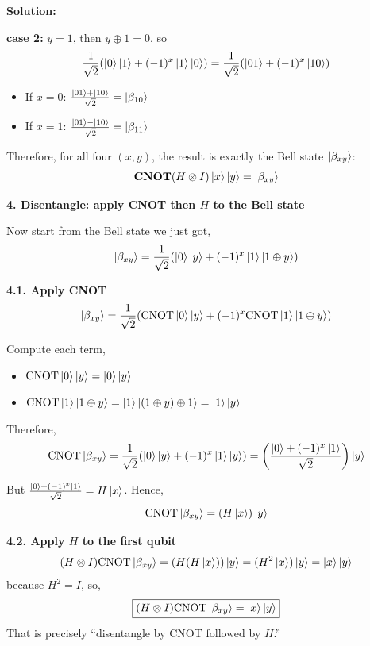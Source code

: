 \documentclass[11pt]{article}
\newenvironment{solution}
{\par\noindent\textbf{Solution:}\par}
{\vspace{1em}}
\begin{document}
\begin{solution}
\textbf{case 2:} $y = 1$, then $y \oplus 1 = 0$, so
\[
\frac{1}{\sqrt{2}}(\ket{0}\ket{1} + (-1)^x\ket{1}\ket{0}) = \frac{1}{\sqrt{2}}(\ket{01} + (-1)^x\ket{10})
\]
\begin{itemize}
    \item If $x = 0$: $\frac{\ket{01} + \ket{10}}{\sqrt{2}} = \ket{\beta_{10}}$
    \item If $x = 1$: $\frac{\ket{01} - \ket{10}}{\sqrt{2}} = \ket{\beta_{11}}$
\end{itemize}

Therefore, for all four $(x, y)$, the result is exactly the Bell state $\ket{\beta_{xy}}$:
\[
\textbf{CNOT}(H \otimes I)\ket{x}\ket{y} = \ket{\beta_{xy}}
\]

\textbf{4. Disentangle: apply CNOT then $H$ to the Bell state}

Now start from the Bell state we just got,
\[
\ket{\beta_{xy}} = \frac{1}{\sqrt{2}}(\ket{0}\ket{y} + (-1)^x \ket{1}\ket{1 \oplus y})
\]

\textbf{4.1. Apply CNOT}
\[
\ket{\beta_{xy}} = \frac{1}{\sqrt{2}}(\text{CNOT}\ket{0}\ket{y} + (-1)^x \text{CNOT}\ket{1}\ket{1 \oplus y})
\]

Compute each term,
\begin{itemize}
    \item $\text{CNOT}\ket{0}\ket{y} = \ket{0}\ket{y}$
    \item $\text{CNOT}\ket{1}\ket{1 \oplus y} = \ket{1}\ket{(1 \oplus y) \oplus 1} = \ket{1}\ket{y}$
\end{itemize}
Therefore,
\[
\text{CNOT}\ket{\beta_{xy}} = \frac{1}{\sqrt{2}}(\ket{0}\ket{y} + (-1)^x\ket{1}\ket{y}) = \left(\frac{\ket{0} + (-1)^x\ket{1}}{\sqrt{2}}\right)\ket{y}
\]

But $\frac{\ket{0} + (-1)^x\ket{1}}{\sqrt{2}} = H\ket{x}$. Hence,
\[
\text{CNOT}\ket{\beta_{xy}} = (H\ket{x})\ket{y}
\]

\textbf{4.2. Apply $H$ to the first qubit}
\[
(H \otimes I) \text{CNOT}\ket{\beta_{xy}} = (H(H\ket{x}))\ket{y} = (H^2\ket{x})\ket{y} = \ket{x}\ket{y}
\]
because $H^2 = I$, so,
\[\boxed{(H \otimes I) \text{CNOT}\ket{\beta_{xy}} = \ket{x}\ket{y}}
\]
That is precisely “disentangle by CNOT followed by $H$.”

\end{solution}
\end{document}
